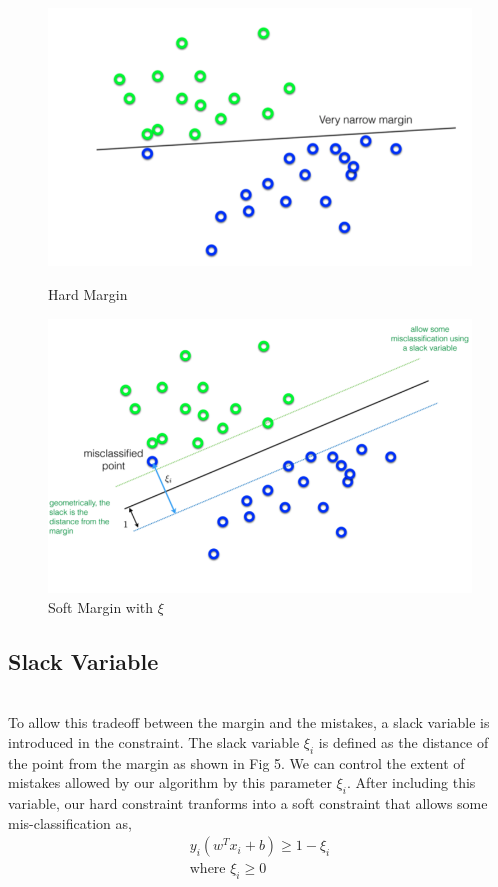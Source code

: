\documentclass[11pt]{article}
\begin{document}
\begin{figure}[!htp]
  \centering
  \begin{minipage}[b]{0.4\textwidth}
    \includegraphics[width=\textwidth]{images/HardMargin.png}
    \caption{Hard Margin}
  \end{minipage}
  \hfill
  \begin{minipage}[b]{0.4\textwidth}
    \includegraphics[width=\textwidth]{images/xiDefinition.png}
    \caption{Soft Margin with \(\xi\)}
  \end{minipage}
   
    \end{figure}


\subsection*{{\textbf{Slack Variable}}}\\
To allow this tradeoff between the margin and the mistakes, a slack variable is introduced in the constraint. The slack variable \(\xi_{i}\) is defined as the distance of the point from the margin as shown in Fig 5. We can control the extent of mistakes allowed by our algorithm by this parameter \(\xi_{i}\). After including this variable, our hard constraint tranforms into a soft constraint that allows some mis-classification as, 
\begin{gather*}
   y_{i}(w^Tx_{i}+b) \geq 1 - \xi_{i} \\
\text{where \(\xi_{i} \geq 0\)}  
\end{gather*}
\end{document}
